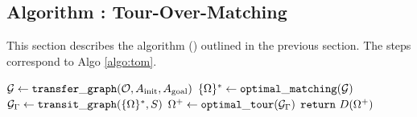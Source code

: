 \subsection{Algorithm : Tour-Over-Matching} 
This section describes the algorithm  (\algo) outlined in the previous section. The steps correspond to Algo \ref{algo:tom}. 

    \begin{algorithm}[t]
    \caption{{\tt \algo}$ (\objectset, \startq, \ainit, \atarget) $}
    \label{algo:tom}
    $ \mathcal{G} \leftarrow \mathtt{transfer\_graph}(\mathcal{O}, A_{\rm init}, A_{\rm goal}) $\;
    $ \{{{\Omega}}\}^* \leftarrow \mathtt{optimal\_matching}(\mathcal{G}) $\;
    $ \mathcal{G}_{{\Gamma}} \leftarrow \mathtt{transit\_graph}(\{{{\Omega}}\}^*, S) $\;
    $ {{\Omega}}^+\leftarrow\mathtt{optimal\_tour}(\mathcal{G}_{{\Gamma}}) $\;
    $ \mathbf{\mathtt{return}}\ \trajset(\scoma^+)$\;
    \end{algorithm}


